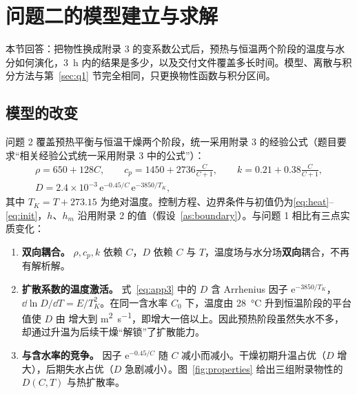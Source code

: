 \FloatBarrier
\section{问题二的模型建立与求解}
\label{sec:q2}

本节回答：把物性换成附录 3 的变系数公式后，预热与恒温两个阶段的温度与水分如何演化，\SI{3}{\hour} 内的结果是多少，以及交付文件覆盖多长时间。模型、离散与积分方法与第~\ref{sec:q1} 节完全相同，只更换物性函数与积分区间。

\subsection{模型的改变}
问题 2 覆盖预热平衡与恒温干燥两个阶段，统一采用附录 3 的经验公式（题目要求“相关经验公式统一采用附录 3 中的公式”）：
\begin{equation}
\begin{gathered}
\rho=650+128C,\qquad c_p=1450+2736\tfrac{C}{C+1},\qquad k=0.21+0.38\tfrac{C}{C+1},\\[-2pt]
D=2.4\times10^{-3}\,\mathrm{e}^{-0.45/C}\,\mathrm{e}^{-3850/T_K},
\end{gathered}
\label{eq:app3}
\end{equation}
其中 $T_K=T+273.15$ 为绝对温度。控制方程、边界条件与初值仍为\eqref{eq:heat}--\eqref{eq:init}，$h$、$h_m$ 沿用附录 2 的值（假设~\ref{as:boundary}）。与问题 1 相比有三点实质变化：

\begin{enumerate}[leftmargin=*,itemsep=0.2em]
  \item \textbf{双向耦合。} $\rho,c_p,k$ 依赖 $C$，$D$ 依赖 $C$ 与 $T$，温度场与水分场\textbf{双向}耦合，不再有解析解。
  \item \textbf{扩散系数的温度激活。} 式~\eqref{eq:app3} 中的 $D$ 含 Arrhenius 因子 $\mathrm{e}^{-3850/T_K}$，$\dd\ln D/\dd T=E/T_K^2$。在同一含水率 $C_0$ 下，温度由 \SI{28}{\celsius} 升到恒温阶段的平台值使 $D$ 由 \sci{\valQtwoDinit} 增大到 \sci{\valDmaxAppendixThree} \si{\square\meter\per\second}，即增大一倍以上。因此预热阶段虽然失水不多，却通过升温为后续干燥“解锁”了扩散能力。
  \item \textbf{与含水率的竞争。} 因子 $\mathrm{e}^{-0.45/C}$ 随 $C$ 减小而减小。干燥初期升温占优（$D$ 增大），后期失水占优（$D$ 急剧减小）。图~\ref{fig:properties} 给出三组附录物性的 $D(C,T)$ 与热扩散率。
\end{enumerate}


